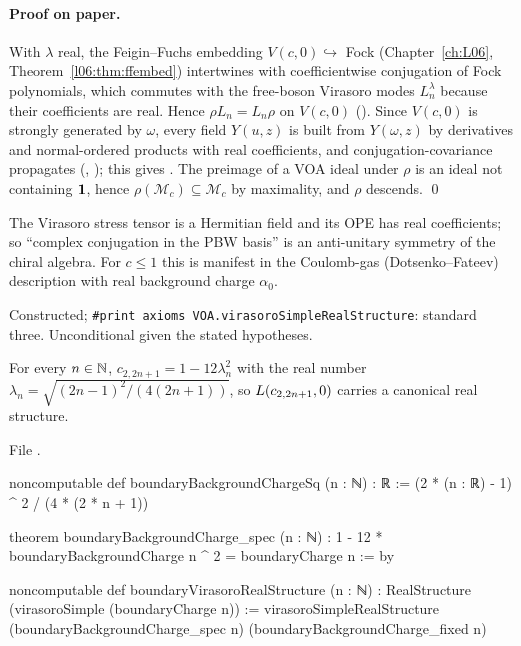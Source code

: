 \paragraph{Proof on paper.} With $\lambda$ real, the Feigin--Fuchs embedding $V(c,0)\hookrightarrow$ Fock
(Chapter~\ref{ch:L06}, Theorem~\ref{l06:thm:ffembed}) intertwines  with coefficientwise
conjugation of Fock polynomials, which commutes with the free-boson Virasoro modes $L_n^\lambda$ because
their coefficients are real. Hence $\rho L_n = L_n\rho$ on $V(c,0)$ (). Since
$V(c,0)$ is strongly generated by $\omega$, every field $Y(u,z)$ is built from $Y(\omega,z)$ by
derivatives and normal-ordered products with real coefficients, and conjugation-covariance propagates
(, ); this gives . The preimage of a VOA
ideal under $\rho$ is an ideal not containing $\mathbf{1}$, hence $\rho(\mathcal M_c)\subseteq\mathcal M_c$
by maximality, and $\rho$ descends. \qed

\begin{physics}
The Virasoro stress tensor is a Hermitian field and its OPE has real coefficients; so ``complex
conjugation in the PBW basis'' is an anti-unitary symmetry of the chiral algebra. For $c\le1$ this is
manifest in the Coulomb-gas (Dotsenko--Fateev) description with real background charge $\alpha_0$.
\end{physics}

\begin{status}
Constructed; \texttt{\#print axioms VOA.virasoroSimpleRealStructure}: standard three. Unconditional
given the stated hypotheses.
\end{status}

\begin{theorem}\label{l19:thm:boundaryreal}
For every $n\in{\mathbb{N}}$, $c_{2,2n+1} = 1-12\lambda_n^2$ with the real number
$\lambda_n = \sqrt{(2n-1)^2/(4(2n+1))}$, so $L(c_{2,2n+1},0)$ carries a canonical real structure.
\end{theorem}

\noindent File .
\begin{leancode}
noncomputable def boundaryBackgroundChargeSq (n : ℕ) : ℝ :=
  (2 * (n : ℝ) - 1) ^ 2 / (4 * (2 * n + 1))

theorem boundaryBackgroundCharge_spec (n : ℕ) :
    1 - 12 * boundaryBackgroundCharge n ^ 2 = boundaryCharge n := by

noncomputable def boundaryVirasoroRealStructure (n : ℕ) :
    RealStructure (virasoroSimple (boundaryCharge n)) :=
  virasoroSimpleRealStructure (boundaryBackgroundCharge_spec n)
    (boundaryBackgroundCharge_fixed n)
\end{leancode}

